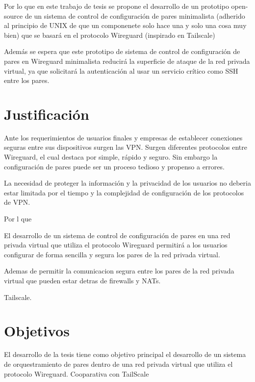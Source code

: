 \documentclass[letterpaper,12pt,oneside]{book}
\begin{document}
Por lo que en este trabajo de tesis se propone el desarrollo de un prototipo open-source de un sistema de control de configuración de pares minimalista (adherido al principio de UNIX de que un componenete solo hace una y solo una cosa muy bien) que se basará en el protocolo Wireguard (inspirado en Tailscale) %

Además se espera que este prototipo de sistema de control de configuración de pares en Wireguard minimalista reducirá la superficie de ataque de la red privada virtual, ya que solicitará la autenticación al usar un servicio crítico como SSH entre los pares.

\section{Justificación}
    
Ante los requerimientos de usuarios finales y empresas de establecer conexiones seguras entre sus dispositivos surgen las VPN. Surgen diferentes protocolos entre Wireguard, el cual destaca por simple, rápido y seguro. Sin embargo la configuración de pares puede ser un proceso tedioso y propenso a errores.

La necesidad de proteger la información y la privacidad de los usuarios no deberia estar limitada por el tiempo y la complejidad de configuración de los protocolos de VPN.

Por l que 

El desarrollo de un sistema de control de configuración de pares en una red privada virtual que utiliza el protocolo Wireguard permitirá a los usuarios configurar de forma sencilla y segura los pares de la red privada virtual.

Ademas de permitir la comunicacion segura entre los pares de la red privada virtual que pueden estar detras de firewalls y NATs.

Tailscale.



\section{Objetivos}

El desarrollo de la tesis tiene como objetivo principal el desarrollo de un sistema de orquestramiento de pares dentro de una red privada virtual que utiliza el protocolo Wireguard.
Cooparativa con TailScale
\end{document}
